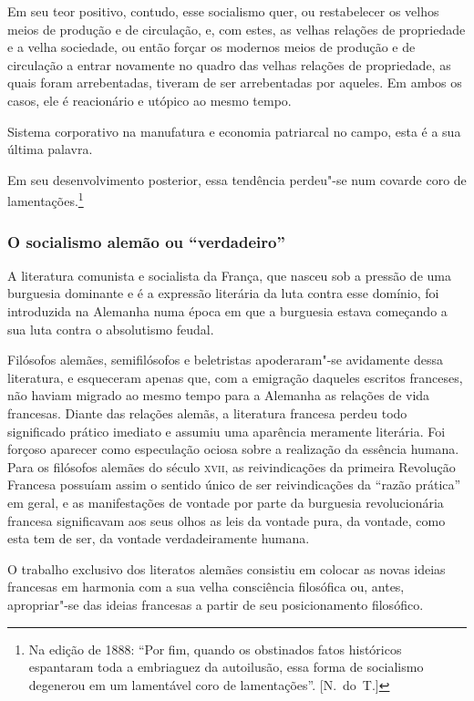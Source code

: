 Em seu teor positivo, contudo, esse socialismo quer, ou restabelecer os
velhos meios de produção e de circulação, e, com estes, as velhas
relações de propriedade e a velha sociedade, ou então forçar os
modernos meios de produção e de circulação a entrar novamente no quadro
das velhas relações de propriedade, as quais foram arrebentadas,
tiveram de ser arrebentadas por aqueles. Em ambos os casos, ele é
reacionário e utópico ao mesmo tempo.

Sistema corporativo na manufatura e economia patriarcal no campo, esta é
a sua última palavra.

Em seu desenvolvimento posterior, essa tendência perdeu"-se num
covarde coro de lamentações.\footnote{ Na edição de 1888: “Por fim, quando os obstinados fatos 		\EP[]
históricos espantaram toda a embriaguez da autoilusão, essa forma de
socialismo degenerou em um lamentável coro de lamentações”. [N.~do~T.]}

\subsubsection{O socialismo alemão ou “verdadeiro”}

A literatura comunista e socialista da França, que nasceu sob a pressão
de uma burguesia dominante e é a expressão literária da luta contra
esse domínio, foi introduzida na Alemanha numa época em que a burguesia
estava começando a sua luta contra o absolutismo feudal.

Filósofos alemães, semifilósofos e beletristas apoderaram"-se
avidamente dessa literatura, e esqueceram apenas que, com a emigração
daqueles escritos franceses, não haviam migrado ao mesmo tempo para a
Alemanha as relações de vida francesas. Diante das relações alemãs, a
literatura francesa perdeu todo significado prático imediato e assumiu
uma aparência meramente literária. Foi forçoso aparecer como
especulação ociosa sobre a realização da essência humana. Para os
filósofos alemães do século \textsc{xvii}, as reivindicações da primeira
Revolução Francesa possuíam assim o sentido único de ser reivindicações
da “razão prática” em geral, e as manifestações de vontade por parte da
burguesia revolucionária francesa significavam aos seus olhos as leis
da vontade pura, da vontade, como esta tem de ser, da vontade
verdadeiramente humana.

O trabalho exclusivo dos literatos alemães consistiu em colocar as novas
ideias francesas em harmonia com a sua velha consciência filosófica ou,
antes, apropriar"-se das ideias francesas a partir de seu
posicionamento filosófico.

